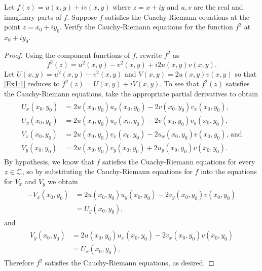 \documentclass[10pt]{amsart}
\begin{document}
\begin{thm}
  \label{Ex2}
  Let $f(z) = u(x,y) + iv(x,y)$ where $z = x+iy$ and $u,v$ are the real and imaginary parts of $f$.
  Suppose $f$ satisfies the Cuachy-Riemann equations at the point $z = x_0+iy_0.$
  Verify the Cauchy-Riemann equations for the function $f^2$ at $x_0 + iy_0$.
  \begin{proof}
    Using the component functions of $f$, rewrite $f^2$ as 
    \begin{equation}
      \label{Ex1:1}
      f^2(z) = u^2(x,y) - v^2(x,y) + i2u(x,y)v(x,y).
    \end{equation}
    Let $U(x,y) = u^2(x,y) - v^2(x,y)$ and $V(x,y) = 2u(x,y)v(x,y)$ so that \eqref{Ex1:1} reduces to $f^2(z) = U(x,y) + iV(x,y)$.
    To see that $f^2(z)$ satisfies the Cauchy-Riemann equations, take the appropriate partial derivatives to obtain
    \begin{align*}
      \begin{split}
        U_x(x_0,y_0) &= 2u(x_0,y_0)u_x(x_0,y_0) - 2v(x_0,y_0)v_x(x_0,y_0),\\
        U_y(x_0,y_0) &= 2u(x_0,y_0)u_y(x_0,y_0) - 2v(x_0,y_0)v_y(x_0,y_0),\\
        V_x(x_0,y_0) &= 2u(x_0,y_0)v_x(x_0,y_0) - 2u_x(x_0,y_0)v(x_0,y_0), \,\text{and}\\
        V_y(x_0,y_0) &= 2u(x_0,y_0)v_y(x_0,y_0) + 2u_y(x_0,y_0)v(x_0,y_0).
      \end{split}
    \end{align*}
    By hypothesis, we know that $f$ satisfies the Cuachy-Riemann equations for every $z \in \mathbb{C}$, so by substituting the Cauchy-Riemann equations for $f$ into the equations for $V_x$ and $V_y$ we obtain
    \begin{align*}
      \begin{split}
        -V_x(x_0,y_0) &= 2u(x_0,y_0)u_y(x_0,y_0) - 2v_y(x_0,y_0)v(x_0,y_0)\\
        &= U_y(x_0,y_0),
    \end{split}
    \end{align*}
    and
    \begin{align*}
      \begin{split}
        V_y(x_0,y_0) &= 2u(x_0,y_0)u_x(x_0,y_0) - 2v_x(x_0,y_0)v(x_0,y_0)\\
        &= U_x(x_0,y_0),
    \end{split}
    \end{align*}
    Therefore $f^2$ satisfies the Cauchy-Riemann equations, as desired.
  \end{proof}
\end{thm}
\end{document}

